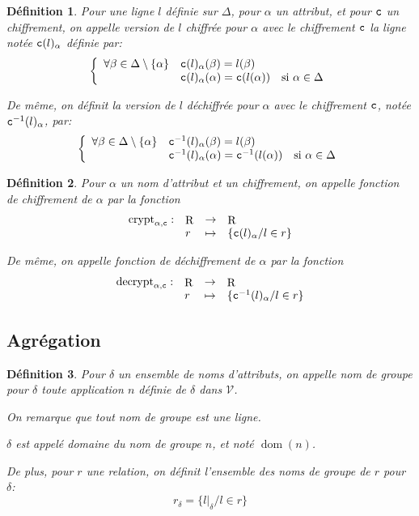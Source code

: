 \documentclass[french]{article}
\DeclareMathOperator{\crypt}{crypt}
\DeclareMathOperator{\decrypt}{decrypt}
\DeclareMathOperator{\dom}{dom}
\DeclareMathOperator{\R}{R}
\newcommand\typeT[1]{\text{\ttfamily #1}}
\newcommand{\decryptArgs}[2]{\decrypt_{#1 , \typeT{#2}}}
\newcommand{\cryptArgs}[2]{\crypt_{#1 , \typeT{#2}}}
\newcommand{\decryptCAlpha}{\decryptArgs{\alpha}{c}}
\newcommand{\cryptCAlpha}{\cryptArgs{\alpha}{c}}
\newcommand{\val}{\mathcal{V}}
\newcommand{\cy}[1]{\typeT{c}(#1)}
\newcommand{\dc}[1]{\typeT{c}^{-1}(#1)}
\newtheorem{defi}{Définition}
\begin{document}
\begin{defi}
	Pour une ligne $l$ définie sur $\Delta$, pour $\alpha$ un attribut,
	et pour $\typeT{c}$ un chiffrement,
	on appelle \emph{version de $l$ chiffrée pour $\alpha$ avec le chiffrement
		$\typeT{c}$}
	la ligne notée $\cy{l}_\alpha$ définie par:
	$$
	\left\lbrace
	\begin{array}{lll}
	\forall \beta \in \Delta \setminus \{\alpha\} & \cy{l}_\alpha(\beta) = l(\beta) & \\
	& \cy{l}_\alpha(\alpha) = \cy{l(\alpha)} & \text{si $\alpha \in \Delta$}
	\end{array}
	\right.
	$$
	
	De même, on définit la \emph{version de $l$ déchiffrée pour $\alpha$ avec le chiffrement
		$\typeT{c}$}, notée $\dc{l}_\alpha$, par:
	$$
	\left\lbrace
	\begin{array}{lll}
	\forall \beta \in \Delta \setminus \{\alpha\} & \dc{l}_\alpha(\beta) = l(\beta) & \\
	& \dc{l}_\alpha(\alpha) = \dc{l(\alpha)} & \text{si $\alpha \in \Delta$}
	\end{array}
	\right.
	$$
\end{defi}

\begin{defi}
	Pour $\alpha$ un nom d'attribut
	et \typeT{c} un chiffrement,
	on appelle \emph{fonction de chiffrement de $\alpha$ par \typeT{c}}
	la fonction
	$$
	\begin{array}{llcl}
	\cryptCAlpha : & \R & \rightarrow & \R \\
		&	r	&	\mapsto & \{ \cy{l}_\alpha / l \in r \}
	\end{array}
	$$
	
	De même, on appelle \emph{fonction de déchiffrement de $\alpha$ par \typeT{c}}
	la fonction
	$$
	\begin{array}{llcl}
	\decryptCAlpha : & \R & \rightarrow & \R \\
	&	r	&	\mapsto & \{ \dc{l}_\alpha / l \in r \}
	\end{array}
	$$
\end{defi}

\subsection*{Agrégation}

\begin{defi}
	Pour $\delta$ un ensemble de noms d'attributs,
	on appelle \emph{nom de groupe pour $\delta$}
	toute application $n$ définie de $\delta$
	dans $\val$.
	
	On remarque que tout nom de groupe est une ligne.
	
	$\delta$ est appelé \emph{domaine} du nom de groupe $n$,
	et noté $\dom(n)$.
	
	De plus, pour $r$ une relation, on définit
	\emph{l'ensemble des noms de groupe de $r$ pour $\delta$}:
	$$
	r_\delta = \{l|_\delta / l \in r \}
	$$
\end{defi}
\end{document}

